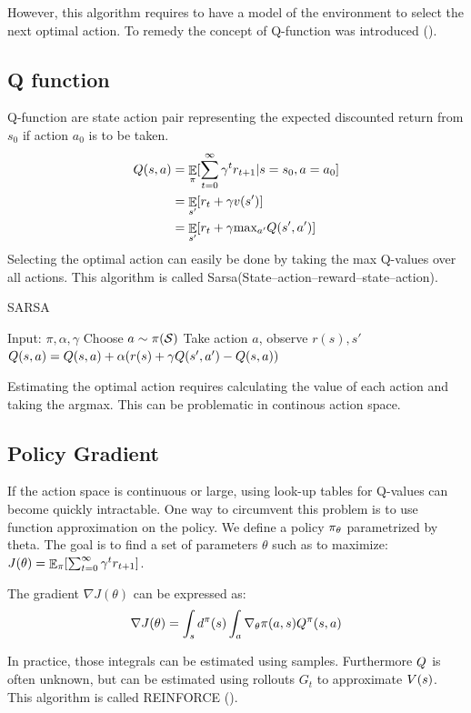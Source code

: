 However, this algorithm requires to have a model of the environment to select the next optimal action. To remedy the concept of Q-function was introduced (\citep{watkins1992q}).

\subsection{Q function}
Q-function are state action pair representing the expected discounted return from $s_0$ if action $a_0$ is to be taken.
\begin{equation}
\begin{split}
    Q(s,a) &= \mathop{\mathbb{E}}_{\pi}[\sum_{t=0}^{\infty} \gamma^t r_{t+1} | s = s_0,a = a_0] \\ 
    &= \mathop{\mathbb{E}}_{s'}[r_t + \gamma v(s')]\\
    &= \mathop{\mathbb{E}}_{s'}[r_t + \gamma \text{max}_{a'} Q(s',a')]
\end{split}
\end{equation}
Selecting the optimal action can easily be done by taking the max Q-values over all actions. This algorithm is called Sarsa(State–action–reward–state–action).\\
\begin{algorithm}[H]
\caption{SARSA}
\begin{algorithmic}[1]
    \STATE Input: $\pi,\alpha,\gamma$
        \STATE Choose $a \sim \pi(\mathcal{S})$
        \STATE Take action $a$, observe $r(s),s'$
        \STATE $Q(s,a) = Q(s,a) + \alpha(  r(s) + \gamma Q(s',a') - Q(s,a)) $
    \ENDFOR
\end{algorithmic}
\label{alg:SARSA}
\end{algorithm}


Estimating the optimal action requires calculating the value of each action and taking the argmax. This can be problematic in continous action space.


\subsection{Policy Gradient}
If the action space is continuous or large, using look-up tables for Q-values can become quickly intractable. One way to circumvent this problem is to use function approximation on the policy. We define a policy $\pi_{\theta}$ parametrized by theta. The goal is to find a set of parameters $\theta$ such as to maximize: $J(\theta)=\mathop{\mathbb{E}}_{\pi}[\sum_{t=0}^{\infty} \gamma^t r_{t+1}]$. 
\begin{definition}
The gradient $\nabla J(\theta)$ can be expressed as:
\begin{equation}
    \nabla J(\theta) = \int_s d^{\pi}(s) \int_a \nabla_{\theta} \pi(a,s)Q^{\pi}(s,a)
\end{equation}
\end{definition}
In practice, those integrals can be estimated using samples. Furthermore $Q$ is often unknown, but can be estimated using rollouts $G_t$ to approximate $V(s)$. This algorithm is called REINFORCE (\citep{williams1995gradient}).

